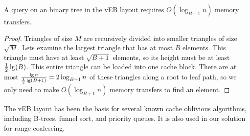 \begin{lemma} 
A query on an binary tree in the vEB layout requires $O(\log_{B+1} n)$
memory transfers. 
\end{lemma}

\begin{proof} 
Triangles of size $M$ are recursively divided into smaller
triangles of size $\sqrt{M}$. Lets examine the largest triangle that has at most
$B$ elements. This triangle must have at least $\sqrt{B+1}$ elements, so its
height must be at least $\frac{1}{2}\lg \mathopen{}\left(B\right)\mathclose{}$. This entire triangle can be loaded
into one cache block. There are at most 
$\frac{\lg n}{\frac{1}{2}\lg \mathopen{}\left(B+1\right)\mathclose{}} = 2 \log_{B+1} n$ 
of these triangles along a root to leaf path, so we only need to make
$O(\log_{B+1} n)$ memory transfers to find an element. 
\end{proof}

The vEB layout has been the basis for several known cache oblivious algorithms, including 
B-trees, funnel sort, and priority queues. It is also used in our solution for range coalescing. 



